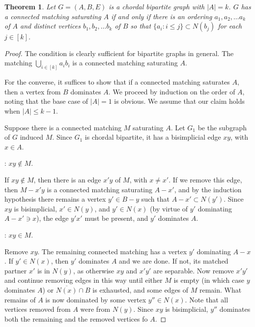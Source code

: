 \documentclass[12 pt]{article}
\newtheorem{theorem}{Theorem}
\begin{document}
\linespread{1.5}
\begin{theorem}
	Let $G = (A,B,E)$ is a chordal bipartite graph with $|A| = k$.  $G$ has a connected matching saturating $A$ if and only if there is an ordering $a_1, a_2, \ldots a_k$ of $A$ and distinct vertices $b_1, b_2, \ldots b_k$ of $B$ so that $\{a_i : i \leq j\} \subset N(b_j)$ for each $j\in [k]$.
\end{theorem}
%
\begin{proof}

	The condition is clearly sufficient for bipartite graphs in general.  The matching $\displaystyle\bigcup_{i \in [k]} a_ib_i$ is a connected matching saturating $A$.

For the converse, it suffices to show that if a connected matching saturates $A$,  then a vertex from $B$ dominates $A$.  We proceed by induction on the order of $A$, noting that the base case of $|A| = 1$ is obvious.
We assume that our claim holds when $|A|\leq k-1$.

Suppose there is a connected matching $M$ saturating $A$.  Let $G_1$ be the subgraph of $G$ induced $M$.  Since $G_1$ is chordal bipartite, it has a bisimplicial edge $xy$, with $x\in A$.

: $xy \notin M$.

If $xy \notin M$,  then there is an edge $x'y$ of $M$, with $x \neq x'$.  If we remove this edge, then $M-x'y$ is a connected matching saturating $A-x'$, and by the induction hypothesis there remains a vertex $y' \in B-y$ such that $A-x' \subset N(y')$.  Since $xy$ is bisimplicial, $x' \in N(y)$, and $y' \in N(x)$ (by virtue of $y'$ dominating $A-x' \ni x$), the edge $y'x'$ must be present, and $y'$ dominates $A$.

: $xy \in M$.

Remove $xy$.  The remaining connected matching has a vertex $y'$ dominating $A-x$.  If $y' \in N(x)$, then $y'$ dominates $A$ and we are done.  If not, its matched partner $x'$ is in $N(y)$, as otherwise $xy$ and $x'y'$ are separable.  Now remove $x'y'$ and continue removing edges in this way until either $M$ is empty (in which case $y$ dominates $A$) or $\overline{N(x)} \cap B$ is exhausted, and some edges of $M$ remain.  What remains of $A$ is now dominated by some vertex $y'' \in N(x)$.  Note that all vertices removed from $A$ were from $N(y)$.  Since $xy$ is bisimplicial, $y''$ dominates both the remaining and the removed vertices fo $A$.
\end{proof}
\end{document}
